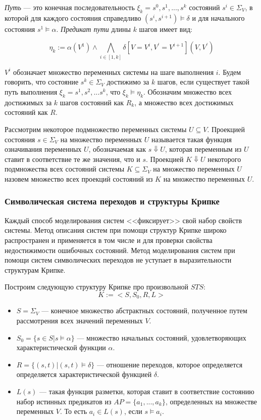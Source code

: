 \textit{Путь} --- это конечная последовательность $\xi_k = s^0, s^1, ..., s^k$ состояний \break $s^{i} \in \Sigma_{V}$, в которой для каждого состояния справедливо $(s^{i}, s^{i+1}) \models \delta$ и для начального состояния $s^1 \models \alpha$. 
\textit{Предикат пути} длины $k$ шагов имеет вид:

\[
\eta_k \mathbf{:=} \alpha(V^{1}) \land \bigwedge_{i \in [1,k]}\delta[V = V^{i}, V^{'} = V^{i+1}](V, V^{'})
\]

$V^{i}$ обозначает множество переменных системы на шаге выполнения $i$.
Будем говорить, что состояние $s^k \in \Sigma_{V}$ достижимо за $k$ шагов, если существует такой путь выполнения $\xi_k = {s^1, s^2, ... s^k}$, что $\xi_k \models \eta_k$.
Обозначим множество всех достижимых за $k$ шагов состояний как $R_k$, а множество всех достижимых состояний как $R$.

Рассмотрим некоторое подмножество переменных системы $U \subseteq V$.
Проекцией состояния $s \in \Sigma_{V}$ на множество переменных $U$ называется такая функция означивания переменных $U$, обозначаемая как $s \Downarrow U$, которая переменным из $U$ ставит в соответствие те же значения, что и $s$.
Проекцией $K \Downarrow U$ некоторого подмножества всех состояний системы $K \subseteq \Sigma_V$ на множество переменных $U$ назовем множество всех проекций состояний из $K$ на множество переменных $U$.


\subsubsection{Символическая система переходов и структуры Крипке}
Каждый способ моделирования систем <<фиксирует>> свой набор свойств системы.
Метод описания систем при помощи структур Крипке широко распространен и применяется в том числе и для проверки свойства недостижимости ошибочных состояний.
Метод моделирования систем при помощи систем символических переходов не уступает в выразительности структурам Крипке.

Построим следующую структуру Крипке про произвольной $STS$:
\[K \mathbf{:=} <S, S_0, R, L>\]

\begin{itemize}
    \item $S = \Sigma_V$ --- конечное множество абстрактных состояний, полученное путем рассмотрения всех значений переменных $V$.
    \item $S_0 = \{s \in S| s \models \alpha\}$ --- множество начальных состояний, удовлетворяющих характеристической функции $\alpha$.
    \item $R = \{(s, t)| (s, t) \models \delta\}$ --- отношение переходов, которое определяется определяется характеристической функцией $\delta$.
    \item $L(s)$ --- такая функция разметки, которая ставит в соответствие состоянию набор истинных предикатов из $AP = \{a_1, ..., a_k\}$, определенных на множестве переменных $V$. То есть $a_i \in L(s)$, если $s \models a_i$.
\end{itemize}

